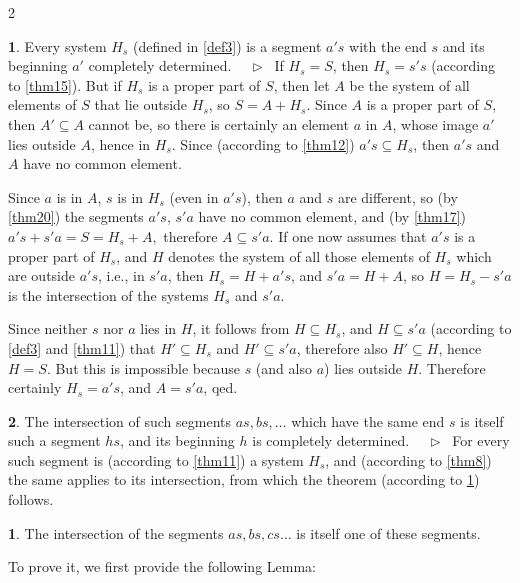 \documentclass[leqno,hidelinks,10pt]{article}
\theoremstyle{definition}
\newtheorem{satz}{\protect\satzname}
\newtheorem*{zusatz}{\protect\zusatzname}
\newcommand{\satzname}{}
\newcommand{\zusatzname}{}
\renewcommand{\satzname}{\hspace{-4pt}.\ Satz}%
\renewcommand{\zusatzname}{Zusatz}%
\renewcommand{\satzname}{\hspace{-4pt}.\ Theorem}%
\renewcommand{\zusatzname}{Corollary}%
\newcommand\Beweis{\medskip \newline $ \phantom{'.'} \rhd \ $}%
\newcommand{\partof}{\subseteq}
\newcommand{\sref}[1]{\underline{\ref{#1}}}%
\begin{document}
\begin{paracol}{2}
\begin{rightcolumn}
\begin{satz}\label{thm27}
Every system $H_s$ (defined in \sref{def3}) is a segment $a's$ with the end $s$
and its beginning $a'$ completely determined.
\Beweis
If $H_s= S$, then $H_s= s's$ (according to \sref{thm15}).
But if $H_s$ is a proper part of $S$, then let $A$ be the system of all elements
of $S$ that lie outside $H_s$, so $S=A+H_s$. Since $A$ is a proper part of $S$,
then $A' \partof A$ cannot be, so there is certainly an element $a$ in $A$, whose
image $a'$ lies outside $A$, hence in $H_s$. Since (according to \sref{thm12})
$a's \partof H_s$, then $a's$ and $A$ have no common element.

Since $a$ is in $A$, $s$ is in $H_s$ (even in $a's$), then $a$ and $s$ are
different, so (by \sref{thm20}) the segments $a's$, $s'a$ have no common element,
and (by \sref{thm17}) $a's+  s'a=S=H_s+ A,$ therefore $A \partof s'a$.
If one now assumes that $a's$ is a proper part of $H_s$, and $H$ denotes the
system of all those elements of $H_s$ which are outside $a's$, i.e., in $s'a$,
then $H_s = H+a's$, and $s'a = H + A$, so $H=H_s-s'a$ is the intersection of the
systems $H_s$ and $s'a$.

Since neither $s$ nor $a$ lies in $H$, it follows from $H \partof H_s$, and
$H \partof s'a$ (according to \sref{def3} and \sref{thm11}) that $H' \partof H_s$
and $H' \partof s'a$, therefore also $H' \partof H$, hence $H = S$. But this is
impossible because $s$ (and also $a$) lies outside $H$. Therefore certainly
$H_s = a's$, and $A = s'a$, qed.
\end{satz}


\begin{satz}\label{thm28}
The intersection of such segments $as, bs, \ldots$ which have the same end $s$ is
itself such a segment $hs$, and its beginning $h$ is completely determined.
\Beweis
For every such segment is (according to \sref{thm11}) a system $H_s$, and
(according to \sref{thm8}) the same applies to its intersection, from which the
theorem (according to \sref{thm27}) follows.
\end{satz}

\begin{zusatz} \label{cor_to_thm28}
The intersection of the segments $as, bs, cs \ldots$ is itself one of these segments.
\end{zusatz}

To prove it, we first provide the following Lemma:


\end{rightcolumn}
\end{paracol}
\end{document}
